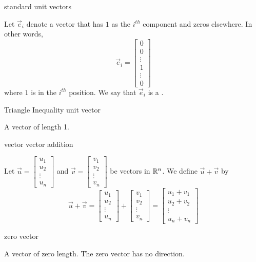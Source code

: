 \documentclass{ximera}
\begin{document}
standard unit vectors
\begin{expandable}
  Let $\vec{e}_i$ denote a vector that has $1$ as the $i^{th}$ component and zeros elsewhere.  In other words, $$\vec{e}_i=\begin{bmatrix}
0\\
0\\
\vdots\\
1\\
\vdots\\
0
\end{bmatrix}$$ 
  where $1$ is in the $i^{th}$ position.  We say that  $\vec{e}_i$ is a .
\end{expandable}
Triangle Inequality
unit vector
\begin{expandable}
    A vector of length 1.
\end{expandable}
vector
vector addition
\begin{expandable}
  Let $\vec{u}=\begin{bmatrix}
u_1\\
u_2\\
\vdots\\
u_n
\end{bmatrix}$ and $\vec{v}=\begin{bmatrix}
v_1\\
v_2\\
\vdots\\
v_n
\end{bmatrix}$ be vectors in $\mathbb{R}^n$.  We define $\vec{u}+\vec{v}$ by
  $$\vec{u}+\vec{v}=\begin{bmatrix}
u_1\\
u_2\\
\vdots\\
u_n
\end{bmatrix}+\begin{bmatrix}
v_1\\
v_2\\
\vdots\\
v_n
\end{bmatrix}=\begin{bmatrix}
u_1+v_1\\
u_2+v_2\\
\vdots\\
u_n+v_n
\end{bmatrix}$$
  \end{expandable}
zero vector
\begin{expandable}
    A vector of zero length.  The zero vector has no direction.
\end{expandable}
\end{document}
